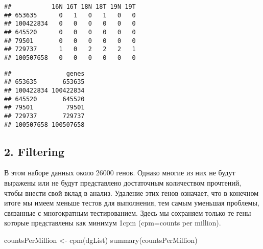 \documentclass[
]{article}
\newenvironment{Shaded}{\begin{snugshade}}{\end{snugshade}}
\newcommand{\FunctionTok}[1]{\textcolor[rgb]{0.00,0.00,0.00}{#1}}
\newcommand{\NormalTok}[1]{#1}
\newcommand{\OtherTok}[1]{\textcolor[rgb]{0.56,0.35,0.01}{#1}}
\newcommand{\SpecialCharTok}[1]{\textcolor[rgb]{0.00,0.00,0.00}{#1}}
\begin{document}
\begin{Shaded}
\end{Shaded}

\begin{verbatim}
##           16N 16T 18N 18T 19N 19T
## 653635      0   1   0   1   0   0
## 100422834   0   0   0   0   0   0
## 645520      0   0   0   0   0   0
## 79501       0   0   0   0   0   0
## 729737      1   0   2   2   2   1
## 100507658   0   0   0   0   0   0
\end{verbatim}

\begin{Shaded}
\end{Shaded}

\begin{verbatim}
##               genes
## 653635       653635
## 100422834 100422834
## 645520       645520
## 79501         79501
## 729737       729737
## 100507658 100507658
\end{verbatim}

\hypertarget{filtering}{%
\subsection{2. Filtering}\label{filtering}}

В этом наборе данных около 26000 генов. Однако многие из них не будут
выражены или не будут представлено достаточным количеством прочтений,
чтобы внести свой вклад в анализ. Удаление этих генов означает, что в
конечном итоге мы имеем меньше тестов для выполнения, тем самым уменьшая
проблемы, связанные с многократным тестированием. Здесь мы сохраняем
только те гены которые представлены как минимум 1cpm (cpm=counts per
million).

\begin{Shaded}
\begin{Highlighting}[]
\NormalTok{countsPerMillion }\OtherTok{\textless{}{-}} \FunctionTok{cpm}\NormalTok{(dgList)}
\FunctionTok{summary}\NormalTok{(countsPerMillion)}
\end{Highlighting}
\end{Shaded}
\end{document}
